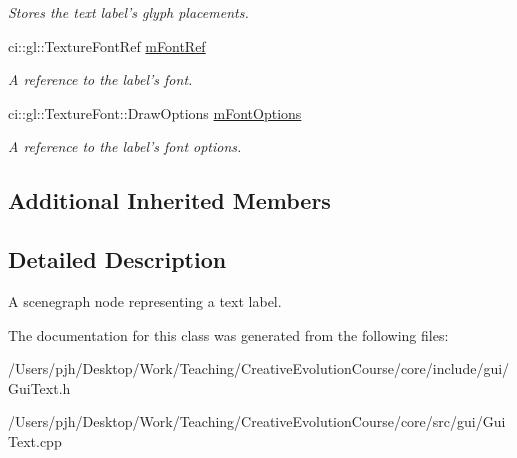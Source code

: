 \begin{DoxyCompactItemize}
\begin{DoxyCompactList}\small\item\em Stores the text label's glyph placements. \end{DoxyCompactList}\item 
\hypertarget{class_gui_text_af11e0fe4d30f9ebd106b4fed42f1fa7f}{ci\-::gl\-::\-Texture\-Font\-Ref \hyperlink{class_gui_text_af11e0fe4d30f9ebd106b4fed42f1fa7f}{m\-Font\-Ref}}\label{class_gui_text_af11e0fe4d30f9ebd106b4fed42f1fa7f}

\begin{DoxyCompactList}\small\item\em A reference to the label's font. \end{DoxyCompactList}\item 
\hypertarget{class_gui_text_a90eb1509012b8ae37cffa32b404965e7}{ci\-::gl\-::\-Texture\-Font\-::\-Draw\-Options \hyperlink{class_gui_text_a90eb1509012b8ae37cffa32b404965e7}{m\-Font\-Options}}\label{class_gui_text_a90eb1509012b8ae37cffa32b404965e7}

\begin{DoxyCompactList}\small\item\em A reference to the label's font options. \end{DoxyCompactList}\end{DoxyCompactItemize}
\subsection*{Additional Inherited Members}


\subsection{Detailed Description}
A scenegraph node representing a text label. 

The documentation for this class was generated from the following files\-:\begin{DoxyCompactItemize}
\item 
/\-Users/pjh/\-Desktop/\-Work/\-Teaching/\-Creative\-Evolution\-Course/core/include/gui/Gui\-Text.\-h\item 
/\-Users/pjh/\-Desktop/\-Work/\-Teaching/\-Creative\-Evolution\-Course/core/src/gui/Gui\-Text.\-cpp\end{DoxyCompactItemize}
